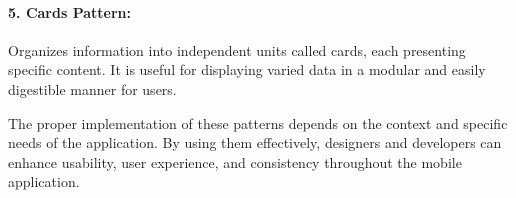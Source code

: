 \documentclass{article}
\begin{document}
\paragraph{5. Cards Pattern:}
Organizes information into independent units called cards, each presenting specific content. It is useful for displaying varied data in a modular and easily digestible manner for users.

The proper implementation of these patterns depends on the context and specific needs of the application. By using them effectively, designers and developers can enhance usability, user experience, and consistency throughout the mobile application.
\end{document}
